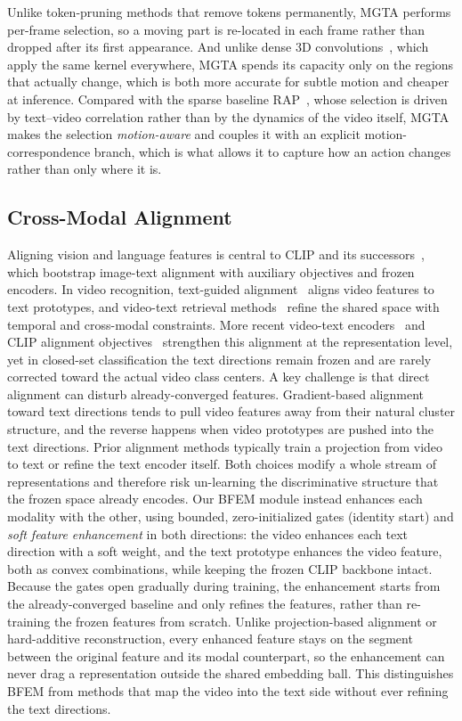 Unlike token-pruning methods that remove tokens permanently, MGTA performs per-frame selection, so a moving part is re-located in each frame rather than dropped after its first appearance. And unlike dense 3D convolutions~\cite{tran2018i3d,feichtenhofer2019slowfast}, which apply the same kernel everywhere, MGTA spends its capacity only on the regions that actually change, which is both more accurate for subtle motion and cheaper at inference. Compared with the sparse baseline RAP~\cite{cao2024rap}, whose selection is driven by text--video correlation rather than by the dynamics of the video itself, MGTA makes the selection \emph{motion-aware} and couples it with an explicit motion-correspondence branch, which is what allows it to capture how an action changes rather than only where it is.

\subsection{Cross-Modal Alignment}
Aligning vision and language features is central to CLIP and its successors~\cite{li2021blip,li2023blip2}, which bootstrap image-text alignment with auxiliary objectives and frozen encoders.
In video recognition, text-guided alignment~\cite{wasim2023vitaclip,ni2022xclip} aligns video features to text prototypes, and video-text retrieval methods~\cite{ju2021clip2video,xue2023clipvip} refine the shared space with temporal and cross-modal constraints.
More recent video-text encoders~\cite{wang2023internvideo,zhm2025siglip2} and CLIP alignment objectives~\cite{zhang2025alignclip} strengthen this alignment at the representation level, yet in closed-set classification the text directions remain frozen and are rarely corrected toward the actual video class centers.
A key challenge is that direct alignment can disturb already-converged features. Gradient-based alignment toward text directions tends to pull video features away from their natural cluster structure, and the reverse happens when video prototypes are pushed into the text directions.
Prior alignment methods typically train a projection from video to text or refine the text encoder itself. Both choices modify a whole stream of representations and therefore risk un-learning the discriminative structure that the frozen space already encodes.
Our BFEM module instead enhances each modality with the other, using bounded, zero-initialized gates (identity start) and \emph{soft feature enhancement} in both directions: the video enhances each text direction with a soft weight, and the text prototype enhances the video feature, both as convex combinations, while keeping the frozen CLIP backbone intact.
Because the gates open gradually during training, the enhancement starts from the already-converged baseline and only refines the features, rather than re-training the frozen features from scratch.
Unlike projection-based alignment or hard-additive reconstruction, every enhanced feature stays on the segment between the original feature and its modal counterpart, so the enhancement can never drag a representation outside the shared embedding ball.
This distinguishes BFEM from methods that map the video into the text side without ever refining the text directions.
